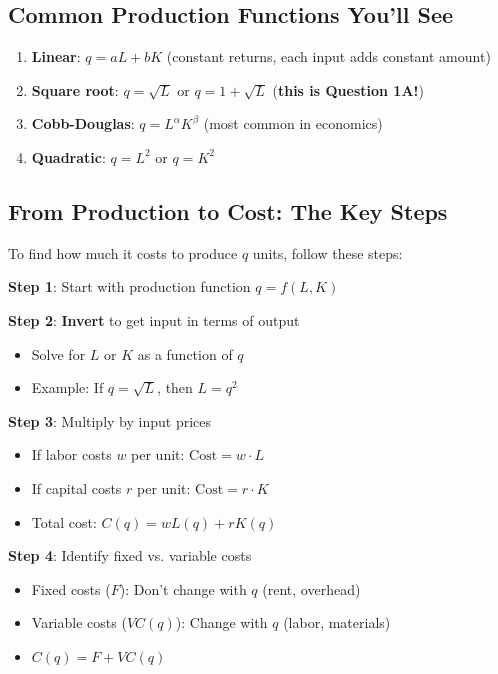 \documentclass[12pt]{article}
\begin{document}
\subsection{Common Production Functions You'll See}

\begin{enumerate}
\item \textbf{Linear}: $q = aL + bK$ (constant returns, each input adds constant amount)

\item \textbf{Square root}: $q = \sqrt{L}$ or $q = 1 + \sqrt{L}$ (\textbf{this is Question 1A!})

\item \textbf{Cobb-Douglas}: $q = L^\alpha K^\beta$ (most common in economics)

\item \textbf{Quadratic}: $q = L^2$ or $q = K^2$
\end{enumerate}

\subsection{From Production to Cost: The Key Steps}

\begin{keyidea}
To find how much it costs to produce $q$ units, follow these steps:

\textbf{Step 1}: Start with production function $q = f(L, K)$

\textbf{Step 2}: \textbf{Invert} to get input in terms of output
\begin{itemize}
\item Solve for $L$ or $K$ as a function of $q$
\item Example: If $q = \sqrt{L}$, then $L = q^2$
\end{itemize}

\textbf{Step 3}: Multiply by input prices
\begin{itemize}
\item If labor costs $w$ per unit: $\text{Cost} = w \cdot L$
\item If capital costs $r$ per unit: $\text{Cost} = r \cdot K$
\item Total cost: $C(q) = wL(q) + rK(q)$
\end{itemize}

\textbf{Step 4}: Identify fixed vs. variable costs
\begin{itemize}
\item Fixed costs ($F$): Don't change with $q$ (rent, overhead)
\item Variable costs ($VC(q)$): Change with $q$ (labor, materials)
\item $C(q) = F + VC(q)$
\end{itemize}
\end{keyidea}
\end{document}
